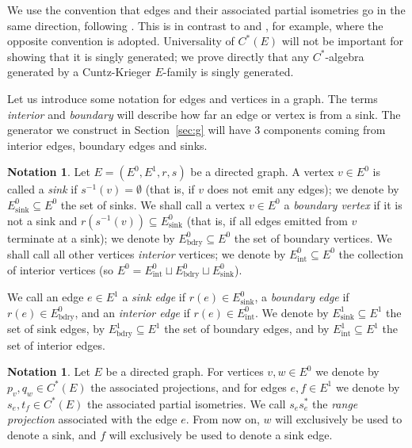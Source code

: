 \documentclass[12pt, a4paper]
{amsart}
\theoremstyle{definition}
\newtheorem{notation}[thm]{Notation}
\theoremstyle{remark}
\numberwithin{equation}{section}
\newcommand{\Esink}{E^0_{\mathrm{sink}}}
\newcommand{\Eboundary}{E^0_{\mathrm{bdry}}}
\newcommand{\Eint}{E^0_{\mathrm{int}}}
\newcommand{\edgesink}{E^1_{\mathrm{sink}}}
\newcommand{\edgebdy}{E^1_{\mathrm{bdry}}}
\newcommand{\edgeint}{E^1_{\mathrm{int}}}
\newcommand{\Cstar}{\ensuremath{C^*}}
\begin{document}
We use the convention that edges and their associated partial isometries go in the same direction, following \cite{Raeburn}. This is in contrast to \cite{Fowler-Laca-Raeburn} and \cite{Rangaswamy-Tomforde}, for example, where the opposite convention is adopted.    
Universality of $\Cstar(E)$ will not be important for showing that it is singly generated; we prove directly that any \Cstar-algebra generated by a Cuntz-Krieger $E$-family is singly generated.

Let us introduce some notation for edges and vertices in a graph. The terms \emph{interior} and \emph{boundary} will describe how far an edge or vertex is from a sink. The generator we construct in Section~\ref{sec:g} will have 3 components coming from interior edges, boundary edges and sinks.

\begin{notation}
    Let $E = (E^0, E^1, r, s)$ be a directed graph. A vertex $v \in E^0$ is called a \emph{sink} if $s^{-1}(v) = \emptyset$ (that is, if $v$ does not emit any edges); we denote by $\Esink \subseteq E^0$ the set of sinks. We shall call a vertex $v \in E^0$ a \emph{boundary vertex} if it is not a sink and $r(s^{-1}(v)) \subseteq \Esink$ (that is, if all edges emitted from $v$ terminate at a sink); we denote by $\Eboundary \subseteq E^0$ the set of boundary vertices. We shall call all other vertices \emph{interior} vertices; we denote by $\Eint \subseteq E^0$ the collection of interior vertices (so $E^0 = \Eint \sqcup \Eboundary \sqcup \Esink$).

    We call an edge $e \in E^1$ a \emph{sink edge} if $r(e) \in \Esink$, a \emph{boundary edge} if $r(e) \in \Eboundary$, and an \emph{interior edge} if $r(e) \in \Eint$. We denote by $\edgesink \subseteq E^1$ the set of sink edges, by $\edgebdy \subseteq E^1$ the set of boundary edges, and by $\edgeint \subseteq E^1$ the set of interior edges.
\end{notation}


\begin{notation}
    Let $E$ be a directed graph. For vertices $v,w \in E^0$ we denote by $p_v, q_w \in \Cstar(E)$ the associated projections, and for edges $e,f \in E^1$ we denote by $s_e, t_f \in \Cstar(E)$ the associated partial isometries. We call $s_e s_e^*$ the \emph{range projection} associated with the edge $e$. From now on, $w$ will exclusively be used to denote a sink, and $f$ will exclusively be used to denote a sink edge.
\end{notation}
\end{document}
